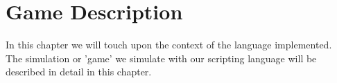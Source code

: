 \chapter{Game Description}
In this chapter we will touch upon the context of the language implemented. \\
The simulation or 'game' we simulate with our scripting language will be described in detail in this chapter.